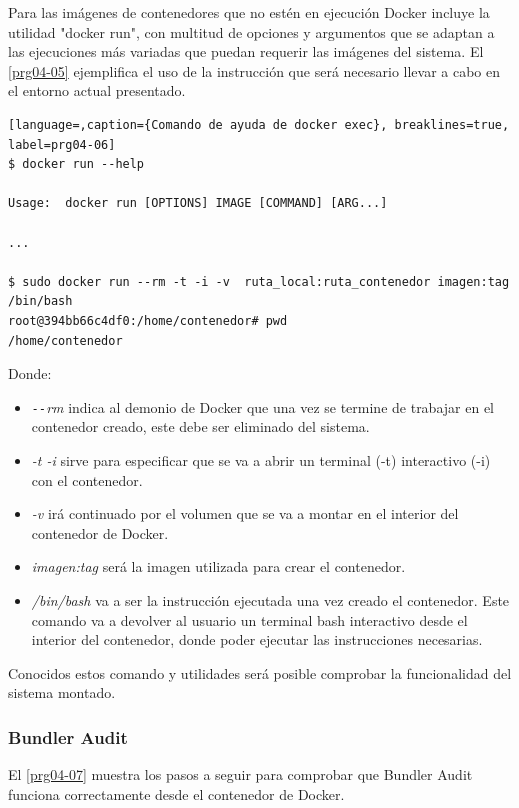 Para las imágenes de contenedores que no estén en ejecución Docker incluye la utilidad "docker run", con multitud de opciones y argumentos que se adaptan a las ejecuciones más variadas que puedan requerir las imágenes del sistema. El \autoref{prg04-05} ejemplifica el uso de la instrucción que será necesario llevar a cabo en el entorno actual presentado.

\begin{lstlisting}[language=,caption={Comando de ayuda de docker exec}, breaklines=true, label=prg04-06]
$ docker run --help

Usage:	docker run [OPTIONS] IMAGE [COMMAND] [ARG...]

...

$ sudo docker run --rm -t -i -v  ruta_local:ruta_contenedor imagen:tag /bin/bash
root@394bb66c4df0:/home/contenedor# pwd
/home/contenedor
\end{lstlisting}

Donde:

\begin{itemize}
	\item \textit{\texttt{-{}-}rm} indica al demonio de Docker que una vez se termine de trabajar en el contenedor creado, este debe ser eliminado del sistema.
	\item \textit{-t -i} sirve para especificar que se va a abrir un terminal (-t) interactivo (-i) con el contenedor.
	\item \textit{-v} irá continuado por el volumen que se va a montar en el interior del contenedor de Docker.
	\item \textit{imagen:tag} será la imagen utilizada para crear el contenedor.
	\item \textit{/bin/bash} va a ser la instrucción ejecutada una vez creado el contenedor. Este comando va a devolver al usuario un terminal bash interactivo desde el interior del contenedor, donde poder ejecutar las instrucciones necesarias.
\end{itemize}

Conocidos estos comando y utilidades será posible comprobar la funcionalidad del sistema montado.

\subsubsection{Bundler Audit}

El \autoref{prg04-07} muestra los pasos a seguir para comprobar que Bundler Audit funciona correctamente desde el contenedor de Docker.

